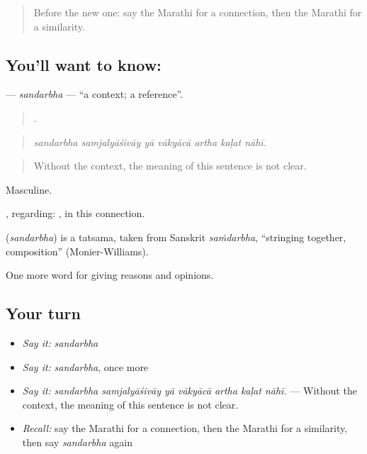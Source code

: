 \label{lesson:MR-C348-sandarbha}



\begin{quote}
Before the new one: say the Marathi for a connection, then the Marathi for a similarity.
\end{quote}

\subsection*{You'll want to know: }
\textbf{} — \emph{sandarbha} — \textquotedblleft{}a context; a reference\textquotedblright{}.

\begin{quote}
      .
\end{quote}

\begin{quote}
\emph{sandarbha samjalyāśivāy yā vākyācā artha kaḷat nāhī.}
\end{quote}

\begin{quote}
Without the context, the meaning of this sentence is not clear.
\end{quote}

Masculine.

, regarding:  , in this connection.

\begin{cousinweb}
\textbf{} (\emph{sandarbha}) is a tatsama, taken from Sanskrit \emph{saṁdarbha}, \textquotedblleft{}stringing together, composition\textquotedblright{} (Monier-Williams).
\end{cousinweb}

\begin{grammarlens}[title={What you've built}]
One more word for giving reasons and opinions.
\end{grammarlens}

\subsection*{Your turn}
\begin{itemize}
\raggedright
  \item \emph{Say it:} \emph{sandarbha}
  \item \emph{Say it:} \emph{sandarbha}, once more
  \item \emph{Say it:} \emph{sandarbha samjalyāśivāy yā vākyācā artha kaḷat nāhī.} — Without the context, the meaning of this sentence is not clear.
  \item \emph{Recall:} say the Marathi for a connection, then the Marathi for a similarity, then say \emph{sandarbha} again
\end{itemize}

